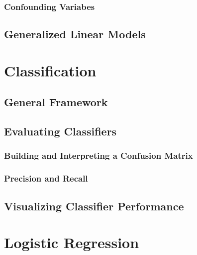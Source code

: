 \documentclass[
]{book}
\begin{document}
\hypertarget{confounding-variabes}{%
\subsubsection{Confounding Variabes}\label{confounding-variabes}}

\hypertarget{generalized-linear-models}{%
\subsection{Generalized Linear Models}\label{generalized-linear-models}}

\hypertarget{classification}{%
\section{Classification}\label{classification}}

\hypertarget{general-framework}{%
\subsection{General Framework}\label{general-framework}}

\hypertarget{evaluating-classifiers}{%
\subsection{Evaluating Classifiers}\label{evaluating-classifiers}}

\hypertarget{building-and-interpreting-a-confusion-matrix}{%
\subsubsection{Building and Interpreting a Confusion Matrix}\label{building-and-interpreting-a-confusion-matrix}}

\hypertarget{precision-and-recall}{%
\subsubsection{Precision and Recall}\label{precision-and-recall}}

\hypertarget{visualizing-classifier-performance}{%
\subsection{Visualizing Classifier Performance}\label{visualizing-classifier-performance}}

\hypertarget{logistic-regression}{%
\section{Logistic Regression}\label{logistic-regression}}
\end{document}
